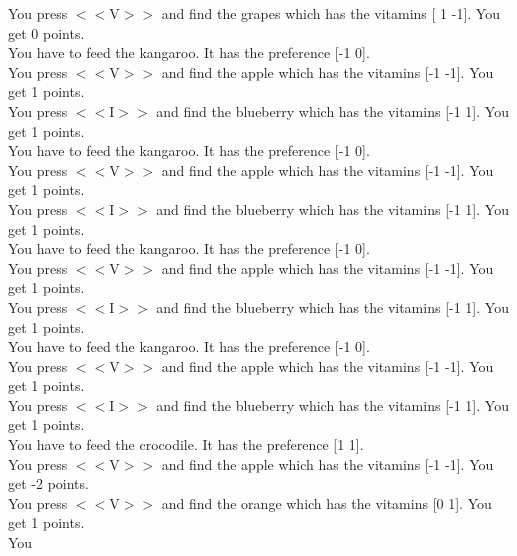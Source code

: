 \documentclass[pdflatex,sn-nature]{sn-jnl}%
\theoremstyle{thmstyleone}%
\theoremstyle{thmstyletwo}%
\theoremstyle{thmstylethree}%
\begin{document}
You press $<<$V$>>$ and find the grapes which has the vitamins [ 1 -1]. You get 0 points. $~$\\ 
You have to feed the kangaroo. It has the preference [-1  0]. $~$\\ 
You press $<<$V$>>$ and find the apple which has the vitamins [-1 -1]. You get 1 points. $~$\\ 
You press $<<$I$>>$ and find the blueberry which has the vitamins [-1  1]. You get 1 points. $~$\\ 
You have to feed the kangaroo. It has the preference [-1  0]. $~$\\ 
You press $<<$V$>>$ and find the apple which has the vitamins [-1 -1]. You get 1 points. $~$\\ 
You press $<<$I$>>$ and find the blueberry which has the vitamins [-1  1]. You get 1 points. $~$\\ 
You have to feed the kangaroo. It has the preference [-1  0]. $~$\\ 
You press $<<$V$>>$ and find the apple which has the vitamins [-1 -1]. You get 1 points. $~$\\ 
You press $<<$I$>>$ and find the blueberry which has the vitamins [-1  1]. You get 1 points. $~$\\ 
You have to feed the kangaroo. It has the preference [-1  0]. $~$\\ 
You press $<<$V$>>$ and find the apple which has the vitamins [-1 -1]. You get 1 points. $~$\\ 
You press $<<$I$>>$ and find the blueberry which has the vitamins [-1  1]. You get 1 points. $~$\\ 
You have to feed the crocodile. It has the preference [1 1]. $~$\\ 
You press $<<$V$>>$ and find the apple which has the vitamins [-1 -1]. You get -2 points. $~$\\ 
You press $<<$V$>>$ and find the orange which has the vitamins [0 1]. You get 1 points. $~$\\ 
You 
\end{document}
